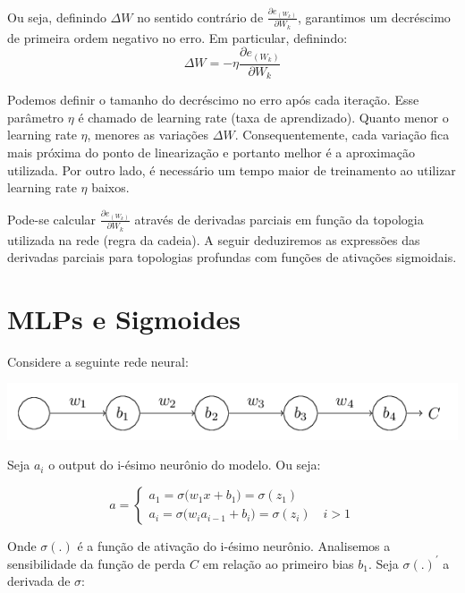 \documentclass[
	12pt,				%
	oneside,			%
	a4paper,			%
	english,			%
	french,				%
	spanish,			%
	brazil,				%
	]{abntex2}
\begin{document}
Ou seja, definindo $\Delta W$ no sentido contr\'ario de $ \frac{ \partial e_{(W_{k})} } { \partial W_k }$, garantimos um decr\'escimo de primeira ordem negativo no erro. Em particular, definindo: 
$$\Delta W = - \eta  \frac{ \partial e_{(W_{k})} } { \partial W_k }  $$

Podemos definir o tamanho do decr\'escimo no erro ap\'os cada itera\c{c}\~ao. Esse par\^ametro $\eta$ \'e chamado de learning rate (taxa de aprendizado). Quanto menor o learning rate $\eta$, menores as varia\c{c}\~oes $\Delta W$. Consequentemente, cada variação fica mais próxima do ponto de linearização e portanto melhor \'e a aproxima\c{c}\~ao utilizada. Por outro lado, é necessário um tempo maior de treinamento ao utilizar learning rate $\eta$ baixos.

Pode-se calcular $ \frac{ \partial e_{(W_{k})} } { \partial W_k }$ através de derivadas parciais em fun\c{c}\~ao da topologia utilizada na rede (regra da cadeia). A seguir deduziremos as expressões das derivadas parciais para topologias profundas com funções de ativações sigmoidais.

\section{MLPs e Sigmoides}

Considere a seguinte rede neural:

\begin{center}
	\includegraphics[scale=0.8]{nnetsimples.png}
\end{center} 

Seja $a_i$ o output do i-\'esimo neur\^onio do modelo. Ou seja:

$$a = \begin{cases}
a_1 = \sigma\big( w_1 x + b_1\big) = \sigma( z_1 ) \\
a_i = \sigma\big( w_i a_{i-1} + b_i\big) = \sigma( z_i ) \enspace \enspace i>1
\end{cases}$$

Onde $\sigma(.)$ \'e a fun\c{c}\~ao de ativa\c{c}\~ao do i-\'esimo neur\^onio. Analisemos a sensibilidade da fun\c{c}\~ao de perda $C$ em rela\c{c}\~ao ao primeiro bias $b_1$. Seja $\sigma(.)^{'}$ a derivada de $\sigma$:
\end{document}
